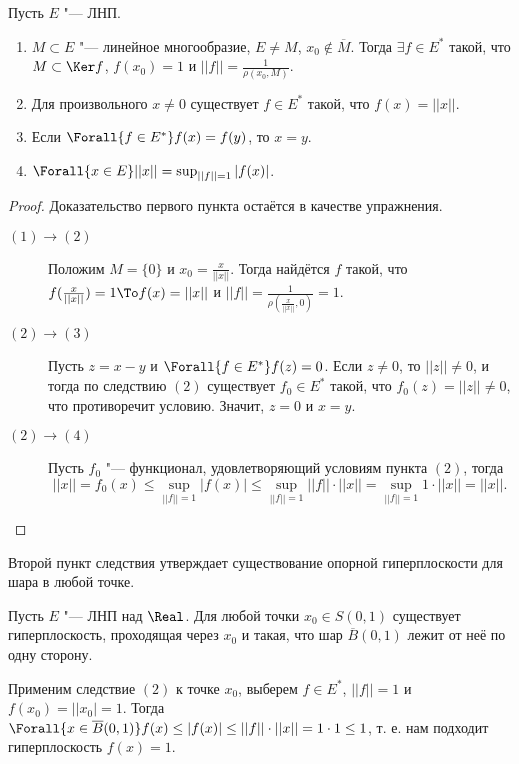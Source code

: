 \documentclass[main]{subfiles}
\begin{document}
\begin{corollary}
  Пусть $E$ "--- ЛНП.
  \begin{enumerate}
    \item $M \subset E$ "--- линейное многообразие, $E \ne M$,
      $x_0 \notin \overline{M}$. Тогда $\exists f \in E^*$ такой,
      что $M \subset \Ker f $, $f(x_0) = 1$ и $||f|| = \frac{1}{\rho(x_0, M)}$.
    \item Для произвольного $x \ne 0$ существует $f \in E^*$ такой, что
      $f(x) = ||x||$.
    \item Если $\Forall{f \in E^*} f(x) = f(y)$, то $x = y$.
    \item $\Forall{x \in E} ||x|| = \sup_{||f|| = 1} |f(x)|$.
  \end{enumerate}
\end{corollary}
\begin{proof}
  Доказательство первого пункта остаётся в качестве упражнения.

  \begin{description}
    \item[$(1) \to (2)$]
      Положим $M = \{ 0 \}$ и $x_0 = \frac{x}{||x||}$. Тогда
      найдётся $f$ такой, что $f(\frac{x}{||x||}) = 1 \To
      f(x) = ||x||$ и $||f|| = \frac{1}{\rho(\frac{x}{||x||}, {0})} = 1$.
    \item[$(2) \to (3)$]
      Пусть $z = x - y$ и $\Forall{f \in E^*} f(z) = 0$.
      Если $z \ne 0$, то $||z|| \ne 0$, и тогда по следствию $(2)$
      существует $f_0 \in E^*$ такой, что $f_0(z) = ||z|| \ne 0$,
      что противоречит условию. Значит, $z = 0$ и $x = y$.
    \item[$(2) \to (4)$]
      Пусть $f_0$ "--- функционал, удовлетворяющий условиям пункта $(2)$,
      тогда
      \[ ||x|| = f_0(x) \le \sup_{||f|| = 1} |f(x)| \le
	\sup_{||f|| = 1} ||f|| \cdot ||x|| =
      \sup_{||f|| = 1} 1 \cdot ||x|| = ||x||. \]
  \end{description}
\end{proof}

\begin{remark}
  Второй пункт следствия утверждает существование опорной гиперплоскости для шара в любой точке.

  Пусть $E$ "--- ЛНП над $\Real$.
  Для любой точки $x_0 \in S(0, 1)$ существует гиперплоскость,
  проходящая через $x_0$ и такая, что шар $\overline{B}(0, 1)$
  лежит от неё по одну сторону.

  Применим следствие $(2)$ к точке $x_0$, выберем $f \in E^*$,
  $||f|| = 1$ и $f(x_0) = ||x_0| = 1$. Тогда
  $\Forall{x \in \overline{B}(0, 1)} f(x) \le |f(x)| \le
  ||f|| \cdot ||x|| = 1 \cdot 1 \le 1$, т. е. нам подходит
  гиперплоскость $f(x) = 1$.
\end{remark}
\end{document}
